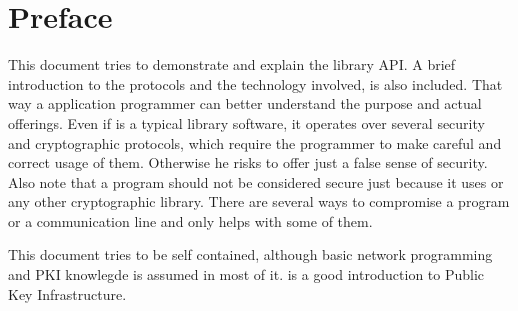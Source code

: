 \chapter{Preface}

This document tries to demonstrate and explain the \gnutls{} library API.
A brief introduction to the protocols and the technology involved, is
also included. That way a \tls{} application programmer can better understand
the \gnutls{} purpose and actual offerings. 
Even if \gnutls{} is a typical library software, it operates over several
security and cryptographic protocols, which require the programmer
to make careful and correct usage of them. Otherwise he risks to offer
just a false sense of security. Also note that a program should not be
considered secure just because it uses \gnutls{} or any other cryptographic library.
There are several ways to compromise a program or a communication line
and \gnutls{} only helps with some of them. 
\par
This document tries to be self contained, although basic 
network programming and PKI knowlegde is assumed in most of it. 
\cite{GUTPKI} is a good introduction to Public Key Infrastructure.

